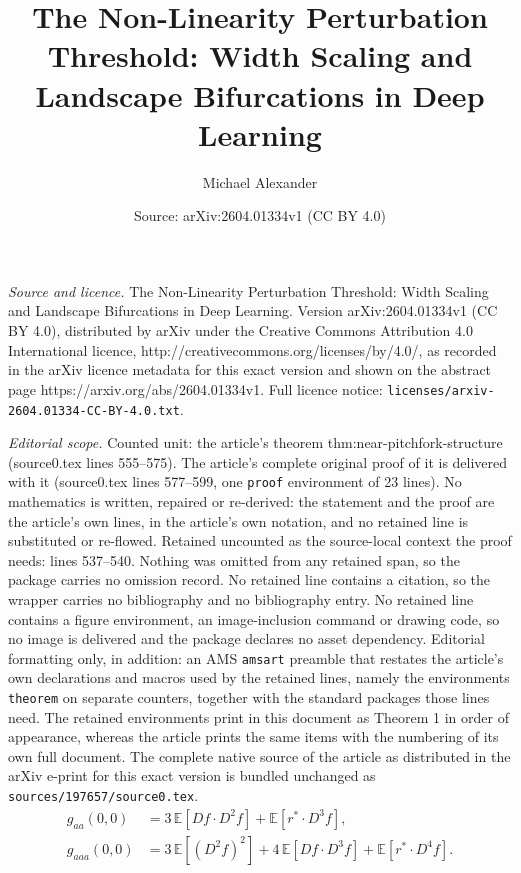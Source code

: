 \documentclass[10pt,a4paper]{amsart}
\title{The Non-Linearity Perturbation Threshold: Width Scaling and Landscape Bifurcations in Deep Learning}
\author{Michael Alexander}
\date{Source: arXiv:2604.01334v1 (CC BY 4.0)}
\begin{document}
\maketitle

\noindent\emph{Source and licence.} The Non-Linearity Perturbation Threshold: Width Scaling and Landscape Bifurcations in Deep Learning. Version arXiv:2604.01334v1 (CC BY 4.0), distributed by arXiv under the Creative Commons Attribution 4.0 International licence, http://creativecommons.org/licenses/by/4.0/, as recorded in the arXiv licence metadata for this exact version and shown on the abstract page https://arxiv.org/abs/2604.01334v1. Full licence notice: \texttt{licenses/arxiv-2604.01334-CC-BY-4.0.txt}.\par\smallskip

\noindent\textit{Editorial scope.} Counted unit: the article's theorem thm:near-pitchfork-structure (source0.tex lines 555--575). The article's complete original proof of it is delivered with it (source0.tex lines 577--599, one \texttt{proof} environment of 23 lines). No mathematics is written, repaired or re-derived: the statement and the proof are the article's own lines, in the article's own notation, and no retained line is substituted or re-flowed.  Retained uncounted as the source-local context the proof needs: lines 537--540.  Nothing was omitted from any retained span, so the package carries no omission record.  No retained line contains a citation, so the wrapper carries no bibliography and no bibliography entry.  No retained line contains a figure environment, an image-inclusion command or drawing code, so no image is delivered and the package declares no asset dependency.  Editorial formatting only, in addition: an AMS \texttt{amsart} preamble that restates the article's own declarations and macros used by the retained lines, namely the environments \texttt{theorem} on separate counters, together with the standard packages those lines need.  The retained environments print in this document as Theorem 1 in order of appearance, whereas the article prints the same items with the numbering of its own full document.  The complete native source of the article as distributed in the arXiv e-print for this exact version is bundled unchanged as \texttt{sources/197657/source0.tex}.
\begin{align}
  g_{aa}(0,0)  &= 3\,\mathbb E[Df\cdot D^2f] + \mathbb E[r^*\cdot D^3f], \label{eq:gaa-exact}\\
  g_{aaa}(0,0) &= 3\,\mathbb E[(D^2f)^2] + 4\,\mathbb E[Df\cdot D^3f] + \mathbb E[r^*\cdot D^4f]. \label{eq:gaaa-exact}
\end{align}
\end{document}
